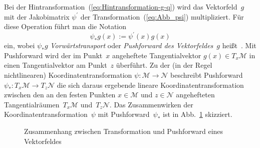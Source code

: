 Bei der Hintransformation~(\ref{eq:Hintransformation-g-q}) wird
das Vektorfeld~$g$ mit der Jakobimatrix $\psi^{\prime}$ der Transformation~(\ref{eq:Abb_psi})
multipliziert. Für diese Operation führt man die Notation 
\begin{equation}
\psi_{*}g(x):=\psi^{\prime}(x)g(x)\label{eq:push-forward-vektor}
\end{equation}
ein, wobei $\psi_{*}g$ \emph{Vorwärtstransport}\emph{
}oder\emph{ Pushforward des Vektorfeldes}~$g$
heißt~\cite{marsden2001}. Mit Push\-forward wird der im Punkt~$x$
angeheftete Tangentialvektor $g(x)\in T_{x}\mathcal{M}$ in einen
Tangentialvektor am Punkt~$z$ überführt. Zu der (in der Regel nichtlinearen)
Koordinatentransformation $\psi:\mathcal{M}\to\mathcal{N}$ beschreibt
Push\-forward $\psi_{*}:T_{x}\mathcal{M}\to T_{z}\mathcal{N}$ die
sich daraus ergebende lineare Koordinatentransformation zwischen den
an den festen Punkten $x\in\mathcal{M}$ und $z\in\mathcal{N}$ angehefteten
Tangentialräumen~$T_{x}\mathcal{M}$ und~$T_{z}\mathcal{N}$. Das
Zusammenwirken der Koordinatentransformation~$\psi$ mit Push\-forward~$\psi_{*}$
ist in Abb.~\ref{fig:Push-Forward-Vektorfeld} skizziert. 

\begin{figure}
\begin{centering}
\resizebox{0.95\textwidth}{!}{}
\par\end{centering}
\caption{Zusammenhang zwischen Transformation und Pushforward eines Vektorfeldes\label{fig:Push-Forward-Vektorfeld}}
\end{figure}

